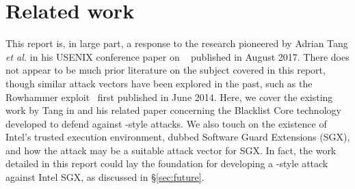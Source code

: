 \chapter{Related work}

This report is, in large part, a response to the research pioneered by Adrian
Tang \textit{et al.} in his USENIX conference paper on
\clkscrew{}~\cite{clkscrew} published in August 2017. There does not appear to
be much prior literature on the subject covered in this report, though similar
attack vectors have been explored in the past, such as the Rowhammer
exploit~\cite{rowhammer} first published in June 2014. Here, we cover the
existing work by Tang in \cite{clkscrew} and his related paper concerning the
Blacklist Core technology~\cite{blacklistCore} developed to defend against
\clkscrew{}-style attacks. We also touch on the existence of Intel's
trusted execution environment, dubbed Software Guard Extensions (SGX), and how
the \clkscrew{} attack may be a suitable attack vector for SGX. In fact, the
work detailed in this report could lay the foundation for developing a
\clkscrew{}-style attack against Intel SGX, as discussed in §\ref{sec:future}.







